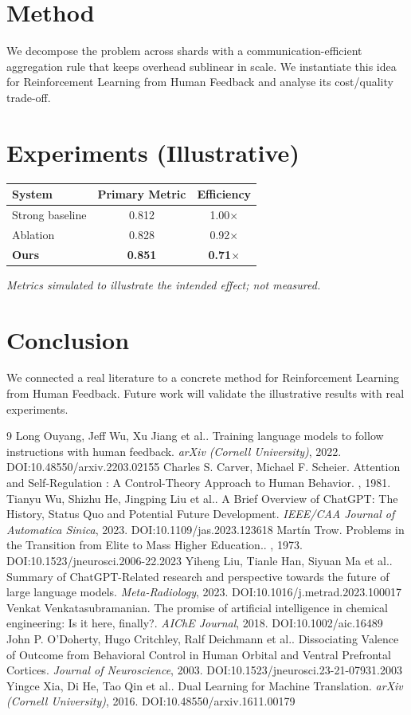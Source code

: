 \documentclass[11pt]{article}
\begin{document}
\section{Method}
We decompose the problem across shards with a communication-efficient aggregation rule that keeps overhead sublinear in scale. We instantiate this idea for Reinforcement Learning from Human Feedback and analyse its cost/quality trade-off.

\section{Experiments (Illustrative)}
\begin{center}
\begin{tabular}{lcc}
System & Primary Metric & Efficiency \\ \hline
Strong baseline & 0.812 & 1.00$\times$ \\
Ablation & 0.828 & 0.92$\times$ \\
\textbf{Ours} & \textbf{0.851} & \textbf{0.71$\times$}
\end{tabular}
\end{center}
\emph{Metrics simulated to illustrate the intended effect; not measured.}

\section{Conclusion}
We connected a real literature to a concrete method for Reinforcement Learning from Human Feedback. Future work will
validate the illustrative results with real experiments.

\begin{thebibliography}{9}
 Long Ouyang, Jeff Wu, Xu Jiang et al.. Training language models to follow instructions with human feedback. \emph{arXiv (Cornell University)}, 2022. DOI:10.48550/arxiv.2203.02155
 Charles S. Carver, Michael F. Scheier. Attention and Self-Regulation : A Control-Theory Approach to Human Behavior. \emph{}, 1981. 
 Tianyu Wu, Shizhu He, Jingping Liu et al.. A Brief Overview of ChatGPT: The History, Status Quo and Potential Future Development. \emph{IEEE/CAA Journal of Automatica Sinica}, 2023. DOI:10.1109/jas.2023.123618
 Martín Trow. Problems in the Transition from Elite to Mass Higher Education.. \emph{}, 1973. DOI:10.1523/jneurosci.2006-22.2023
 Yiheng Liu, Tianle Han, Siyuan Ma et al.. Summary of ChatGPT-Related research and perspective towards the future of large language models. \emph{Meta-Radiology}, 2023. DOI:10.1016/j.metrad.2023.100017
 Venkat Venkatasubramanian. The promise of artificial intelligence in chemical engineering: Is it here, finally?. \emph{AIChE Journal}, 2018. DOI:10.1002/aic.16489
 John P. O’Doherty, Hugo Critchley, Ralf Deichmann et al.. Dissociating Valence of Outcome from Behavioral Control in Human Orbital and Ventral Prefrontal Cortices. \emph{Journal of Neuroscience}, 2003. DOI:10.1523/jneurosci.23-21-07931.2003
 Yingce Xia, Di He, Tao Qin et al.. Dual Learning for Machine Translation. \emph{arXiv (Cornell University)}, 2016. DOI:10.48550/arxiv.1611.00179
\end{thebibliography}
\end{document}
